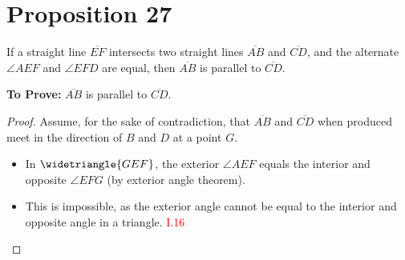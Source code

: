 
\section*{Proposition 27}

\begin{thm}
If a straight line $\overline{EF}$ intersects two straight lines $\overline{AB}$ and $\overline{CD}$, and the alternate $\angle{AEF}$ and $\angle{EFD}$ are equal, then $\overline{AB}$ is parallel to $\overline{CD}$.
\end{thm}

\textbf{To Prove:} $\overline{AB}$ is parallel to $\overline{CD}$.

\begin{proof}

Assume, for the sake of contradiction, that $\overline{AB}$ and $\overline{CD}$ when produced meet in the direction of $B$ and $D$ at a point $G$.

\begin{figure}[H]
\end{figure}

\begin{itemize}
   \item In $\widetriangle{GEF}$,  the exterior $\angle{AEF}$ equals the interior and opposite $\angle{EFG}$ (by exterior angle theorem).

\begin{figure}[H]   
\end{figure}   
   
   
   \item This is impossible, as the exterior angle cannot be equal to the interior and opposite angle in a triangle.\hfill\textcolor{red}{ I.16}
\end{itemize}


\end{proof}
